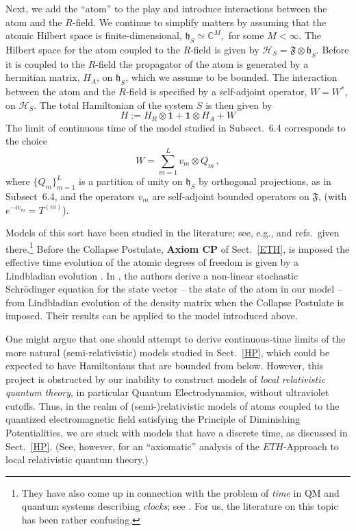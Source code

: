 \documentclass[a4paper,11pt]{article}
\begin{document}
{Next, we add the ``atom'' to the play and introduce interactions between the atom and the $R$-field. We continue to simplify matters by assuming that the atomic Hilbert space is finite-dimensional, $\mathfrak{h}_S\simeq \mathbb{C}^{M},$ for some $M< \infty$. The Hilbert space for the atom coupled to the $R$-field is given by $\mathcal{H}_S = \mathfrak{F}\otimes \mathfrak{h}_S$. Before it is coupled to the $R$-field the propagator of the atom is generated by a hermitian matrix, $H_A$, on $\mathfrak{h}_S$, which we assume to be bounded. The interaction between the atom and the $R$-field is specified by a self-adjoint operator, $W=W^{*}$, 
on $\mathcal{H}_S$. The total Hamiltonian of the system $S$ is then given by
\begin{equation}\label{Ham}
H:= H_R\otimes \mathbf{1} + \mathbf{1}\otimes H_A + W
\end{equation}
The limit of continuous time of the model studied in Subsect.~6.4 corresponds to the choice
$$W= \sum_{m=1}^{L} v_m\otimes Q_m\,,$$
where $\big\{Q_m\big\}_{m=1}^{L}$ is a partition of unity on $\mathfrak{h}_S$ by orthogonal projections, as in Subsect~6.4, and the operators $v_m$ are self-adjoint bounded operators on $\mathfrak{F}$, (with $e^{-iv_m} = T^{(m)}$). 

Models of this sort have been studied in the literature; see, e.g., \cite{H-P, FGH} and refs.~given there.\footnote{They have also come up in connection with the problem of \textit{time} in QM and quantum systems describing \textit{clocks}; see \cite{clocks}. For us, the literature on this topic has been rather confusing.} Before the Collapse Postulate, {\bf{Axiom CP}} of Sect.~\ref{ETH}, is imposed the effective time evolution of the atomic degrees of freedom is given by a Lindbladian evolution \cite{GKS, Lindblad}. In \cite{Bassi}, the authors derive a non-linear stochastic Schr\"odinger equation for the state vector -- the state of the atom in our model -- from Lindbladian evolution of the density matrix when the Collapse Postulate is imposed. Their results can be applied to the model introduced above.

One might argue that one should attempt to derive continuous-time limits of the more natural (semi-relativistic) models studied in Sect.~\ref{HP}, which could be expected to have Hamiltonians that are bounded from below. However, this project is obstructed by our inability to construct models of \textit{local relativistic quantum theory}, in particular Quantum Electrodynamics, without ultraviolet cutoffs. Thus, in the realm of (semi-)relativistic models of atoms coupled to the quantized electromagnetic field satisfying the Principle of Diminishing Potentialities, we are stuck with models that have a discrete time, as discussed in Sect.~\ref{HP}. (See, however, \cite{Fr2} for an ``axiomatic'' analysis of the $ETH$-Approach to local relativistic quantum theory.)

}
\end{document}
